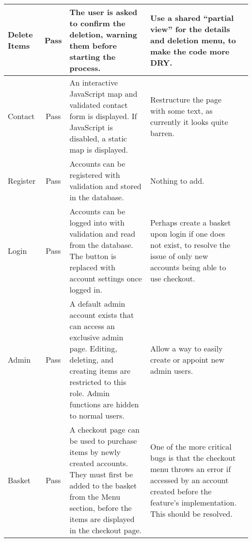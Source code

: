 \documentclass{article}
\begin{document}
\begin{adjustwidth}{-2cm}{-2cm}
\begin{center}
\begin{longtable}{|p{1.2cm}|c|p{5cm}|p{5cm}|c|}
      Delete Items & Pass & 
      The user is asked to confirm the deletion, warning them before starting the process. &
      Use a shared ``partial view'' for the details and deletion menu, to make the code more DRY.\\ \hline

      Contact & Pass &
      An interactive JavaScript map and validated contact form is displayed. If JavaScript is disabled, a static map is displayed. &
      Restructure the page with some text, as currently it looks quite barren. \\ \hline

      Register & Pass &
      Accounts can be registered with validation and stored in the database. &
      Nothing to add. \\ \hline

      Login & Pass &
      Accounts can be logged into with validation and read from the database. The button is replaced with account settings once logged in. &
      Perhaps create a basket upon login if one does not exist, to resolve the issue of only new accounts being able to use checkout. \\ \hline

      Admin & Pass &
      A default admin account exists that can access an exclusive admin page. Editing, deleting, and creating items are restricted to this role. Admin functions are hidden to normal users. &
      Allow a way to easily create or appoint new admin users. \\ \hline

      Basket & Pass &
      A checkout page can be used to purchase items by newly created accounts. They must first be added to the basket from the Menu section, before the items are displayed in the checkout page. &
      One of the more critical bugs is that the checkout menu throws an error if accessed by an account created before the feature's implementation. This should be resolved. \\ \hline


    \end{longtable}
  \end{center}
\end{adjustwidth}
\end{document}
